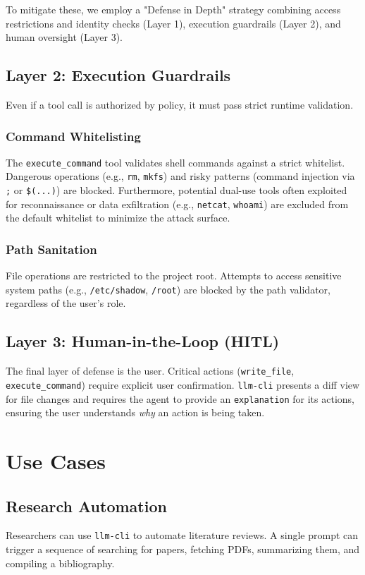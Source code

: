 \documentclass[conference]{IEEEtran}
\begin{document}
To mitigate these, we employ a "Defense in Depth" strategy combining access restrictions and identity checks (Layer 1), execution guardrails (Layer 2), and human oversight (Layer 3).

\subsection{Layer 2: Execution Guardrails}
Even if a tool call is authorized by policy, it must pass strict runtime validation.

\subsubsection{Command Whitelisting}
The \texttt{execute\_command} tool validates shell commands against a strict whitelist. Dangerous operations (e.g., \texttt{rm}, \texttt{mkfs}) and risky patterns (command injection via \texttt{;} or \texttt{\$(...)}) are blocked. Furthermore, potential dual-use tools often exploited for reconnaissance or data exfiltration (e.g., \texttt{netcat}, \texttt{whoami}) are excluded from the default whitelist to minimize the attack surface.

\subsubsection{Path Sanitation}
File operations are restricted to the project root. Attempts to access sensitive system paths (e.g., \texttt{/etc/shadow}, \texttt{/root}) are blocked by the path validator, regardless of the user's role.

\subsection{Layer 3: Human-in-the-Loop (HITL)}
The final layer of defense is the user. Critical actions (\texttt{write\_file}, \texttt{execute\_command}) require explicit user confirmation. \texttt{llm-cli} presents a diff view for file changes and requires the agent to provide an \texttt{explanation} for its actions, ensuring the user understands \textit{why} an action is being taken.

\section{Use Cases}

\subsection{Research Automation}
Researchers can use \texttt{llm-cli} to automate literature reviews. A single prompt can trigger a sequence of searching for papers, fetching PDFs, summarizing them, and compiling a bibliography.
\end{document}
